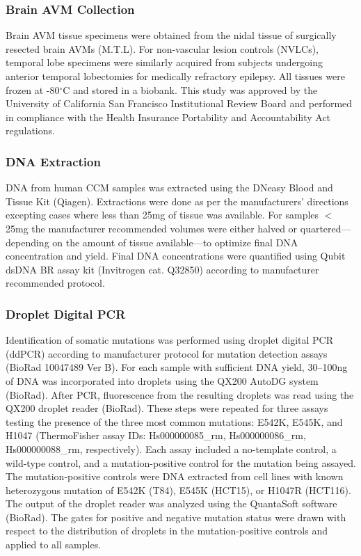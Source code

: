 \subsubsection{Brain AVM Collection}
Brain AVM tissue specimens were obtained from the nidal tissue of surgically resected brain AVMs (M.T.L). For non-vascular lesion controls (NVLCs), temporal lobe specimens were similarly acquired from subjects undergoing anterior temporal lobectomies for medically refractory epilepsy. All tissues were frozen at -80$^{\circ}$C and stored in a biobank. This study was approved by the University of California San Francisco Institutional Review Board and performed in compliance with the Health Insurance Portability and Accountability Act regulations.

\subsubsection{DNA Extraction}
DNA from human CCM samples was extracted using the DNeasy Blood and Tissue Kit (Qiagen). Extractions were done as per the manufacturers’ directions excepting cases where less than 25mg of tissue was available. For samples $<$25mg the manufacturer recommended volumes were either halved or quartered---depending on the amount of tissue available---to optimize final DNA concentration and yield. Final DNA concentrations were quantified using Qubit dsDNA BR assay kit (Invitrogen cat. Q32850) according to manufacturer recommended protocol. 

\subsubsection{Droplet Digital PCR}
Identification of somatic  mutations was performed using droplet digital PCR (ddPCR) according to manufacturer protocol for mutation detection assays (BioRad 10047489 Ver B). For each sample with sufficient DNA yield, 30--100ng of DNA was incorporated into droplets using the QX200 AutoDG system (BioRad). After PCR, fluorescence from the resulting droplets was read using the QX200 droplet reader (BioRad). These steps were repeated for three assays testing the presence of the three most common  mutations: E542K, E545K, and H1047 (ThermoFisher assay IDs: Hs000000085\_rm, Hs000000086\_rm, Hs000000088\_rm, respectively). Each assay included a no-template control, a wild-type control, and a mutation-positive control for the mutation being assayed. The mutation-positive controls were DNA extracted from cell lines with known heterozygous mutation of E542K (T84), E545K (HCT15), or H1047R (HCT116).  The output of the droplet reader was analyzed using the QuantaSoft software (BioRad). The gates for positive and negative mutation status were drawn with respect to the distribution of droplets in the mutation-positive controls and applied to all samples. 

